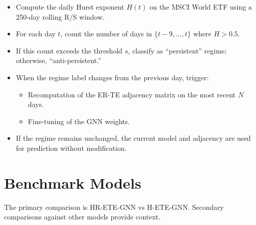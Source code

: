 \documentclass[12pt,oneside]{report}
\begin{document}
\begin{itemize}
  \item Compute the daily Hurst exponent $H(t)$ on the MSCI World ETF
        using a 250-day rolling R/S window.
  \item For each day $t$, count the number of days in
        $\{t - 9, \ldots, t\}$ where $H > 0.5$.
  \item If this count exceeds the threshold $s$, classify as
        ``persistent'' regime; otherwise, ``anti-persistent.''
  \item When the regime label changes from the previous day, trigger:
        \begin{itemize}
          \item Recomputation of the ER-TE adjacency matrix on the most
                recent $N$ days.
          \item Fine-tuning of the GNN weights.
        \end{itemize}
  \item If the regime remains unchanged, the current model and adjacency
        are used for prediction without modification.
\end{itemize}

\section{Benchmark Models}

The primary comparison is HR-ETE-GNN vs H-ETE-GNN. Secondary comparisons
against other models provide context.
\end{document}
